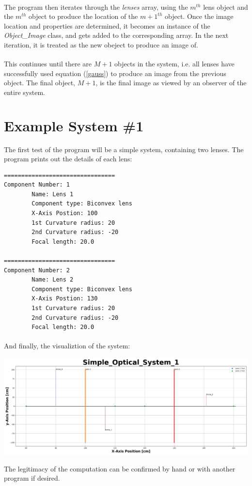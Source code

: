 \documentclass[12pt,letterpaper]{article}
\begin{document}
\paragraph*{}The program then iterates through the \textit{lenses} array, using the $m^{th}$ lens object and the $m^{th}$ object to produce the location of the $m+1^{th}$ object. Once the image location and properties are determined, it becomes an instance of the \textit{Object\_Image} class, and gets added to the corresponding array. In the next iteration, it is treated as the new obeject to produce an image of. 
\paragraph*{}This continues until there are $M+1$ objects in the system, i.e. all lenses have successfully used equation (\ref{gauss}) to produce an image from the previous object. The final object, $M+1$, is the final image as viewed by an observer of the entire system.

\pagebreak

\section{Example System \#1}
\paragraph*{}The first test of the program will be a simple system, containing two lenses. The program prints out the details of each lens:
\begin{verbatim}
================================
Component Number: 1
        Name: Lens 1
        Component type: Biconvex lens
        X-Axis Postion: 100
        1st Curvature radius: 20
        2nd Curvature radius: -20
        Focal length: 20.0

================================
Component Number: 2
        Name: Lens 2
        Component type: Biconvex lens
        X-Axis Postion: 130
        1st Curvature radius: 20
        2nd Curvature radius: -20
        Focal length: 20.0
\end{verbatim}
\paragraph*{}And finally, the visualiztion of the system:
\begin{center}
\includegraphics[scale=0.34]{Simple_Optical_System_1}
\end{center}
The legitimacy of the computation can be confirmed by hand or with another program if desired.
\end{document}
